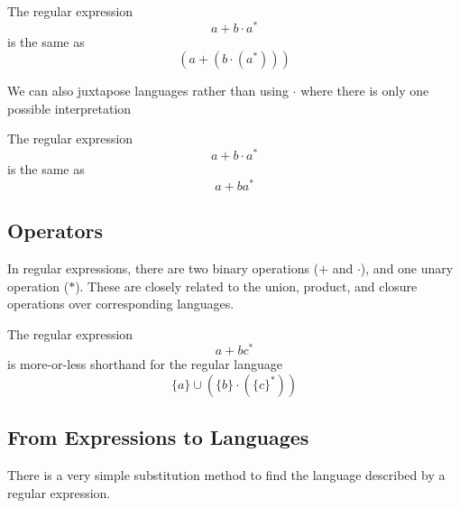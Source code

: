 \begin{example*}{}{}
  The regular expression
  \begin{equation*}
    a + b \cdot a^*
  \end{equation*}
  is the same as
  \begin{equation*}
    (a + (b \cdot (a^*)))
  \end{equation*}
\end{example*}

We can also juxtapose languages rather than using $\cdot$ where there is only one possible interpretation

\begin{example*}{}{}
  The regular expression
  \begin{equation*}
    a + b \cdot a^*
  \end{equation*}
  is the same as
  \begin{equation*}
    a + ba^*
  \end{equation*}
\end{example*}

\subsection*{Operators}

In regular expressions, there are two binary operations ($+$ and $\cdot$), and one unary operation ($*$). These are
 closely related to the union, product, and closure operations over corresponding languages.

\begin{example*}{}{}
  The regular expression
  \begin{equation*}
    a + bc^*
  \end{equation*}
  is more-or-less shorthand for the regular language
  \begin{equation*}
    \{a\} \cup (\{b\} \cdot ({\{c\}}^*))
  \end{equation*}
\end{example*}

\subsection*{From Expressions to Languages}

There is a very simple substitution method to find the language described by a regular expression.

